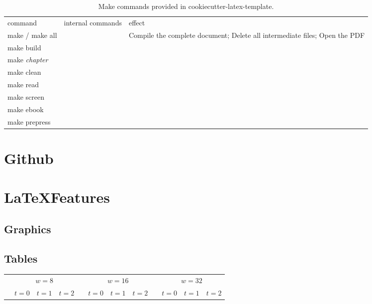 \documentclass[{{cookiecutter.project_slug}}.tex]{subfiles}
\begin{document}
{%
\newcommand{\ra}[1]{\renewcommand{\arraystretch}{#1}}
{%
\begin{table*}
\centering
\begin{tabular}{}
\toprule
command & internal commands & effect \\
make / make all & & Compile the complete document; Delete all intermediate files; Open the PDF \\
make build & & \\
make \textit{chapter} & & \\
make clean & & \\
make read & & \\
make screen & & \\
make ebook & & \\
make prepress & & \\
\midrule

\bottomrule
\end{tabular}
\caption{Make commands provided in cookiecutter-latex-template.}
\end{table*}

 
\section{Github}

\section{\LaTeX Features}

\subsection{Graphics}

\subsection{Tables}

{%
	\newcommand{\ra}[1]{\renewcommand{\arraystretch}{#1}}
{%
\begin{table*}
	\centering
	\ra{1.3}
	\begin{tabular}{@{}rrrrcrrrcrrr@{}}
		\toprule
		& 
		\multicolumn{3}{c}{$w = 8$} & \phantom{abc}& \multicolumn{3}{c}{$w = 16$} & \phantom{abc} & \multicolumn{3}{c}{$w = 32$}\\
		\cmidrule{2-4} \cmidrule{6-8}\cmidrule{10-12}& $t=0$ & $t=1$ & $t=2$ && $t=0$ & $t=1$ & $t=2$ && $t=0$ & $t=1$ & $t=2$\\
		\midrule
		

\end{tabular}
\end{table*}}}}}
\end{document}
